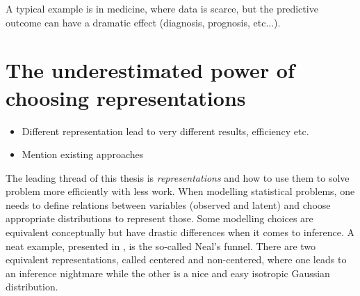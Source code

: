A typical example is in medicine, where data is scarce, but the predictive outcome can have a dramatic effect (diagnosis, prognosis, etc...).



\section{The underestimated power of choosing representations}

\begin{itemize}
    \item Different representation lead to very different results, efficiency etc.
    \item Mention existing approaches
\end{itemize}
The leading thread of this thesis is \textit{representations} and how to use them to solve problem more efficiently with less work.
When modelling statistical problems, one needs to define relations between variables (observed and latent) and choose appropriate distributions to represent those.
Some modelling choices are equivalent conceptually but have drastic differences when it comes to inference.
A neat example, presented in \citet{gorinovaAutomaticReparameterisationProbabilistic2020}, is the so-called Neal's funnel.
There are two equivalent representations, called centered and non-centered, where one leads to an inference nightmare while the other is a nice and easy isotropic Gaussian distribution.

